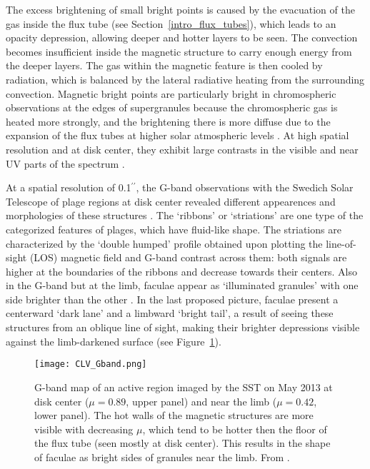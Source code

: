 \documentclass[goettingen, gauss, print]{thesis}
\begin{document}
The excess brightening of small bright points is caused by the evacuation of the gas inside the flux tube (see Section~\ref{intro_flux_tubes}), which leads to an opacity depression, allowing deeper and hotter layers to be seen. The convection becomes insufficient inside the magnetic structure to carry enough energy from the deeper layers. The gas within the magnetic feature is then cooled by radiation, which is balanced by the lateral radiative heating from the surrounding convection.
Magnetic bright points are particularly bright in chromospheric observations at the edges of supergranules because the chromospheric gas is heated more strongly, and the brightening there is more diffuse due to the expansion of the flux tubes at higher solar atmospheric levels \citep{jafarzadeh_structure_2013}. At high spatial resolution and at disk center, they exhibit large contrasts in the visible and near UV parts of the spectrum \citep{riethmuller_bright_2010}.

At a spatial resolution of 0.1$^{\prime\prime}$, the G-band \citep{muller_variability_1984} observations with the Swedich Solar Telescope \citep[SST,][]{scharmer_1-meter_2003} of plage regions at disk center revealed different appearences and morphologies of these structures \citep{berger_solar_2004}. The `ribbons' or `striations' are one type of the categorized features of plages, which have fluid-like shape.
The  striations are characterized by the `double humped' profile obtained upon plotting the line-of-sight (LOS) magnetic field and G-band contrast across them: 
both signals are higher at the boundaries of the ribbons and decrease towards their centers. Also in the G-band but at the limb, faculae appear as `illuminated granules' with one side brighter than the other \citep{hirzberger_solar_2005}. In the last proposed picture, faculae present a centerward `dark lane' and a limbward `bright tail', a result of seeing these structures from an oblique line of sight, making their brighter depressions visible against the limb-darkened surface (see Figure~\ref{CLV_Gband}).

\begin{figure}
\centering
\texttt{[image: CLV\_Gband.png]}
\caption{G-band map of an active region imaged by the SST on May 2013 at disk center ($\mu=0.89$, upper panel) and near the limb ($\mu=0.42$, lower panel). The hot walls of the magnetic structures are more visible with decreasing $\mu$, which tend to be hotter then the floor of the flux tube (seen mostly at disk center). This results in the shape of faculae as bright sides of granules near the limb. From \cite{berger_contrast_2007}.}
\label{CLV_Gband}

\end{figure}
\end{document}
